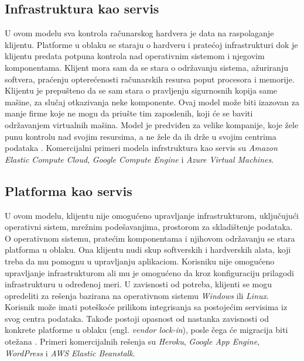 \documentclass[12pt,oneside]{memoir}
\begin{document}
\subsection{Infrastruktura kao servis}

U ovom modelu sva kontrola računarskog hardvera je data na raspolaganje klijentu. Platforme u oblaku se staraju o hardveru i pratećoj infrastrukturi dok je klijentu predata potpuna kontrola nad operativnim sistemom i njegovim komponentama. Klijent mora sam da se stara o održavanju sistema, ažuriranju softvera, praćenju opterećenosti računarskih resursa poput procesora i memorije. Klijentu je prepušteno da se sam stara o pravljenju sigurnosnih kopija same mašine, za slučaj otkazivanja neke komponente. Ovaj model može biti izazovan za manje firme koje ne mogu da priušte tim zaposlenih, koji će se baviti održavanjem virtualnih mašina. Model je predviđen za velike kompanije, koje žele punu kontrolu nad svojim resursima, a ne žele da ih drže u svojim centrima podataka \cite{cc}. Komercijalni primeri modela infrstruktura kao servis su \emph{Amazon Elastic Compute Cloud}, \emph{Google Compute Engine} i \emph{Azure Virtual Machines}. 

 
\subsection{Platforma kao servis}
U ovom modelu, klijentu nije omogućeno upravljanje infrastrukturom, uključujući operativni sistem, mrežnim podešavanjima, prostorom za skladištenje podataka. O operativnom sistemu, pratećim komponentama i njihovom održavanju se stara platforma u oblaku. Ona klijentu nudi skup softverskih i hardverskih alata, koji treba da mu pomognu u upravljanju aplikaciom. Korisniku nije omogućeno upravljanje infrastrukturom ali mu je omogućeno da kroz konfiguraciju prilagodi infrastrukturu u određenoj meri. U zavisnosti od potreba, klijenti se mogu opredeliti za rešenja bazirana na operativnom sistemu \emph{Windows} ili \emph{Linux}. Korisnik može imati poteškoće prilikom integrisanja sa postojećim servisima iz svog centra podataka. Takođe postoji opasnost od nastanka zavisnosti od konkrete platforme u oblaku (engl. \emph{vendor lock-in}), posle čega će migracija biti otežana \cite{cc}. Primeri komercijalnih rešenja su \emph{Heroku}, \emph{Google App Engine}, \emph{WordPress} i \emph{AWS Elastic Beanstalk}. 
\end{document}
